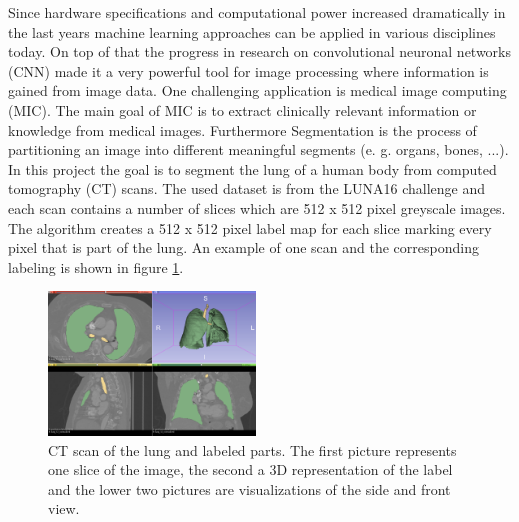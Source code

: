 
Since hardware specifications and computational power increased dramatically in the last years machine learning approaches can be applied in various disciplines today. On top of that the progress in research on convolutional neuronal networks (CNN) made it a very powerful tool for image processing where information is gained from image data.\newline
One challenging application is medical image computing (MIC). The main goal of MIC is to extract clinically relevant information or knowledge from medical images. Furthermore Segmentation is the process of partitioning an image into different meaningful segments (e. g. organs, bones, ...).\newline
In this project the goal is to segment the lung of a human body from computed tomography (CT) scans.\newline
The used dataset is from the LUNA16 challenge \cite{luna} and each scan contains a number of slices which are 512 x 512 pixel greyscale images. The algorithm creates a 512 x 512 pixel label map for each slice marking every pixel that is part of the lung. An example of one scan and the corresponding labeling is shown in figure \ref{scan_picture}.

\begin{figure}[h!]
	\includegraphics[width=0.49\textwidth, angle=0]{files/Fulllayoutprediction.png}
	\caption{CT scan of the lung and labeled parts. The first picture represents one slice of the image, the second a 3D representation of the label and the lower two pictures are visualizations of the side and front view.}
	\label{scan_picture}
\end{figure}

